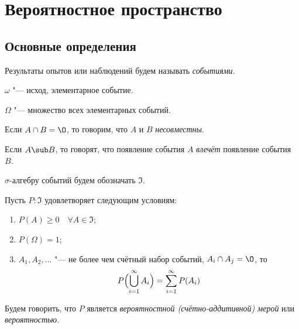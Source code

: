 \chapter{Вероятностное пространство}

\section{Основные определения}

\begin{definition}
	Результаты опытов или наблюдений будем называть \emph{событиями}.
\end{definition}

\begin{notation}
	$ \omega $ "--- исход, элементарное событие.
\end{notation}

\begin{notation}
	$ \Omega $ "--- множество всех элементарных событий.
\end{notation}

\begin{definition}
	Если $ A \cap B = \O $, то говорим, что $ A $ и $ B $ \emph{несовместны}.
\end{definition}

\begin{definition}
	Если $ A \sub B $, то говорят, что появление события $ A $ \emph{влечёт} появление события $ B $.
\end{definition}

\begin{notation}
	$ \sigma $-алгебру событий будем обозначать $ \Im $.
\end{notation}

\begin{definition}
	Пусть $ P : \Im $ удовлетворяет следующим условиям:
	\begin{enumerate}
		\item $ P(A) \ge 0 \quad \forall A \in \Im $;
		\item $ P(\Omega) = 1 $;
		\item $ A_1, A_2, \dotsc $ "--- не более чем счётный набор событий,
			$ A_i \cap A_j = \O $, то
			$$ P \Bigl( \bigcup_{i = 1}^\infty A_i \Bigr) = \sum_{i = 1}^\infty P(A_i) $$
	\end{enumerate}

	Будем говорить, что $ P $ является \emph{вероятностной (счётно-аддитивной) мерой} или
	\emph{вероятностью}.
\end{definition}

